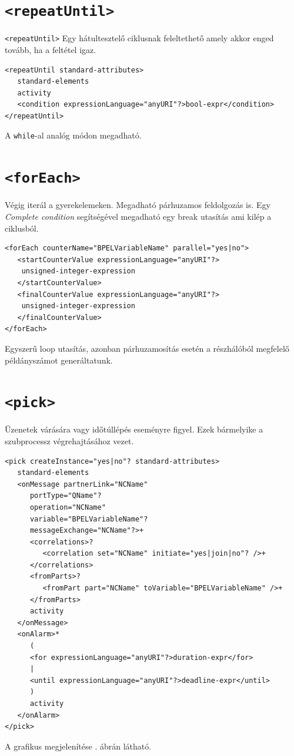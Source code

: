 \section{\texttt{<repeatUntil>}}
\texttt{<repeatUntil>} Egy hátultesztelő ciklusnak feleltethető amely akkor enged tovább, ha a feltétel igaz. 
\begin{verbatim}
<repeatUntil standard-attributes>
   standard-elements
   activity
   <condition expressionLanguage="anyURI"?>bool-expr</condition>
</repeatUntil>
\end{verbatim}
A \texttt{while}-al analóg módon megadható.

\section{\texttt{<forEach>}}
Végig iterál a gyerekelemeken. Megadható párhuzamos feldolgozás is. Egy \textit{Complete condition} segítségével megadható egy break utasítás ami kilép a ciklusból. 
\begin{verbatim}
<forEach counterName="BPELVariableName" parallel="yes|no">
   <startCounterValue expressionLanguage="anyURI"?>
  	unsigned-integer-expression
   </startCounterValue>
   <finalCounterValue expressionLanguage="anyURI"?>
  	unsigned-integer-expression
   </finalCounterValue>
</forEach>
\end{verbatim}
Egyszerű loop utasítás, azonban párhuzamosítás esetén a részhálóból megfelelő példányszámot generáltatunk. 

\section{\texttt{<pick>}}
Üzenetek várására vagy időtúllépés eseményre figyel. Ezek bármelyike a szubprocessz végrehajtásához vezet. 
\begin{verbatim}
<pick createInstance="yes|no"? standard-attributes>
   standard-elements
   <onMessage partnerLink="NCName"
      portType="QName"?
      operation="NCName"
      variable="BPELVariableName"?
      messageExchange="NCName"?>+
      <correlations>?
         <correlation set="NCName" initiate="yes|join|no"? />+
      </correlations>
      <fromParts>?
         <fromPart part="NCName" toVariable="BPELVariableName" />+
      </fromParts>
      activity
   </onMessage>
   <onAlarm>*
      (
      <for expressionLanguage="anyURI"?>duration-expr</for>
      |
      <until expressionLanguage="anyURI"?>deadline-expr</until>
      )
      activity
   </onAlarm>
</pick>
\end{verbatim}
A grafikus megjelenítése . ábrán látható.


